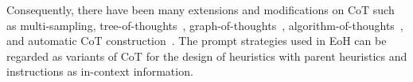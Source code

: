 Consequently, there have been many extensions and modifications on CoT such as multi-sampling, tree-of-thoughts~\cite{long2023large}, graph-of-thoughts~\cite{yao2023beyond}, algorithm-of-thoughts~\cite{sel2023algorithm}, and automatic CoT construction~\cite{kojima2022large,xu2023reprompting}. The prompt strategies used in EoH can be regarded as variants of CoT for the design of heuristics with parent heuristics and instructions as in-context information. 


    
    



